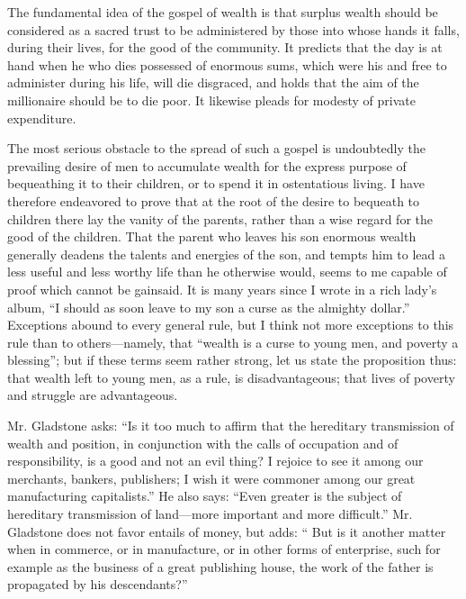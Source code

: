 \documentclass[11pt,openany]{book}
\begin{document}
The fundamental idea of the gospel of wealth is that surplus wealth should be considered as a sacred trust to be administered by those into whose hands it falls, during their lives, for the good of the community. It predicts that the day is at hand when he who dies possessed of enormous sums, which were his and free to administer during his life, will die disgraced, and holds that the aim of the millionaire should be to die poor. It likewise pleads for modesty of private expenditure.

The most serious obstacle to the spread of such a gospel is undoubtedly the prevailing desire of men to accumulate wealth for the express purpose of bequeathing it to their children, or to spend it in ostentatious living. I have therefore endeavored to prove that at the root of the desire to bequeath to children there lay the vanity of the parents, rather than a wise regard for the good of the children. That the parent who leaves his son enormous wealth generally deadens the talents and energies of the son, and tempts him to lead a less useful and less worthy life than he otherwise would, seems to me capable of proof which cannot be gainsaid. It is many years since I wrote in a rich lady's album, ``I should as soon leave to my son a curse as the almighty dollar.'' Exceptions abound to every general rule, but I think not more exceptions to this rule than to others---namely, that ``wealth is a curse to young men, and poverty a blessing''; but if these terms seem rather strong, let us state the proposition thus: that wealth left to young men, as a rule, is disadvantageous; that lives of poverty and struggle are advantageous.

Mr. Gladstone asks: ``Is it too much to affirm that the hereditary transmission of wealth and position, in conjunction with the calls of occupation and of responsibility, is a good and not an evil thing? I rejoice to see it among our merchants, bankers, publishers; I wish it were commoner among our great manufacturing capitalists.'' He also says: ``Even greater is the subject of hereditary transmission of land---more important and more difficult.'' Mr. Gladstone does not favor entails of money, but adds: `` But is it another matter when in commerce, or in manufacture, or in other forms of enterprise, such for example as the business of a great publishing house, the work of the father is propagated by his descendants?''
\end{document}
